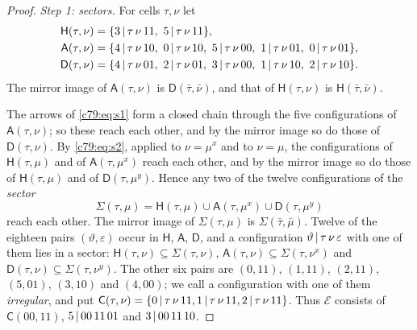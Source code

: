 \begin{proof}
\emph{Step 1: sectors.} For cells $\tau,\nu$ let
\begin{align*}
\mathsf H(\tau,\nu)&=\{\cfg3\tau\nu{11},\ \cfg5\tau\nu{11}\},\\
\mathsf A(\tau,\nu)&=\{\cfg4\tau\nu{10},\ \cfg0\tau\nu{10},\ \cfg5\tau\nu{00},\ \cfg1\tau\nu{01},\ \cfg0\tau\nu{01}\},\\
\mathsf D(\tau,\nu)&=\{\cfg4\tau\nu{01},\ \cfg2\tau\nu{01},\ \cfg3\tau\nu{00},\ \cfg1\tau\nu{10},\ \cfg2\tau\nu{10}\}.
\end{align*}
The mirror image of $\mathsf A(\tau,\nu)$ is $\mathsf D(\bar\tau,\bar\nu)$, and that of $\mathsf H(\tau,\nu)$ is $\mathsf H(\bar\tau,\bar\nu)$.

The arrows of \eqref{c79:eq:s1} form a closed chain through the five configurations of $\mathsf A(\tau,\nu)$; so these reach each other, and by the mirror image so do those of $\mathsf D(\tau,\nu)$. By \eqref{c79:eq:s2}, applied to $\nu=\mu^x$ and to $\nu=\mu$, the configurations of $\mathsf H(\tau,\mu)$ and of $\mathsf A(\tau,\mu^x)$ reach each other, and by the mirror image so do those of $\mathsf H(\tau,\mu)$ and of $\mathsf D(\tau,\mu^y)$. Hence any two of the twelve configurations of the \emph{sector}
\[
\Sigma(\tau,\mu)=\mathsf H(\tau,\mu)\cup\mathsf A(\tau,\mu^x)\cup\mathsf D(\tau,\mu^y)
\]
reach each other. The mirror image of $\Sigma(\tau,\mu)$ is $\Sigma(\bar\tau,\bar\mu)$. Twelve of the eighteen pairs $(\vartheta,\varepsilon)$ occur in $\mathsf H$, $\mathsf A$, $\mathsf D$, and a configuration $\vartheta\,|\,\tau\,\nu\,\varepsilon$ with one of them lies in a sector: $\mathsf H(\tau,\nu)\subseteq\Sigma(\tau,\nu)$, $\mathsf A(\tau,\nu)\subseteq\Sigma(\tau,\nu^x)$ and $\mathsf D(\tau,\nu)\subseteq\Sigma(\tau,\nu^y)$. The other six pairs are $(0,11)$, $(1,11)$, $(2,11)$, $(5,01)$, $(3,10)$ and $(4,00)$; we call a configuration with one of them \emph{irregular}, and put $\mathsf C(\tau,\nu)=\{0\,|\,\tau\,\nu\,11,1\,|\,\tau\,\nu\,11,2\,|\,\tau\,\nu\,11\}$. Thus $\mathcal E$ consists of $\mathsf C(00,11)$, $5\,|\,00\,11\,01$ and $3\,|\,00\,11\,10$.


\end{proof}

